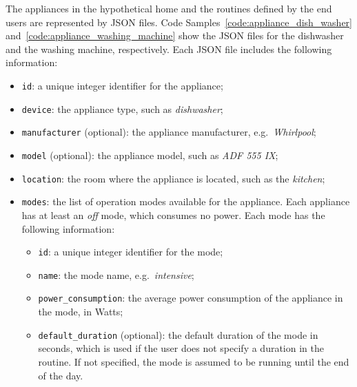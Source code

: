 The appliances in the hypothetical home and the routines defined by the end users are represented by JSON files. Code Samples~\ref{code:appliance_dish_washer} and~\ref{code:appliance_washing_machine} show the JSON files for the dishwasher and the washing machine, respectively. Each JSON file includes the following information:
\begin{itemize}
    \item \texttt{id}: a unique integer identifier for the appliance;
    \item \texttt{device}: the appliance type, such as \textit{dishwasher};
    \item \texttt{manufacturer} (optional): the appliance manufacturer, e.g.\ \textit{Whirlpool};
    \item \texttt{model} (optional): the appliance model, such as \textit{ADF 555 IX};
    \item \texttt{location}: the room where the appliance is located, such as the \textit{kitchen};
    \item \texttt{modes}: the list of operation modes available for the appliance. Each appliance has at least an \textit{off} mode, which consumes no power. Each mode has the following information:
    \begin{itemize}
        \item \texttt{id}: a unique integer identifier for the mode;
        \item \texttt{name}: the mode name, e.g.\ \textit{intensive};
        \item \texttt{power\_consumption}: the average power consumption of the appliance in the mode, in Watts; 
        \item \texttt{default\_duration} (optional): the default duration of the mode in seconds, which is used if the user does not specify a duration in the routine. If not specified, the mode is assumed to be running until the end of the day.
    \end{itemize}
\end{itemize}





